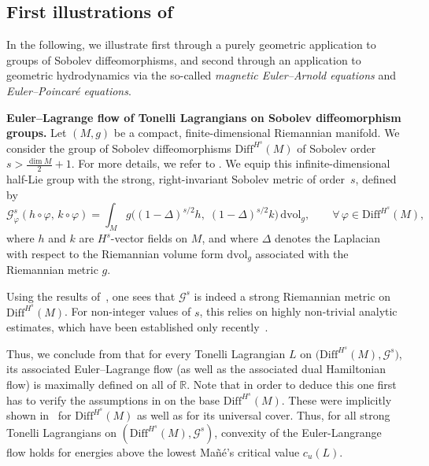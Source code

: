 \documentclass[11pt,reqno]{amsart}
\theoremstyle{plain}
\theoremstyle{definition}
\theoremstyle{plain} %
\theoremstyle{definition} %
\numberwithin{equation}{section}
\def\RR{{\mathbb R}}
\begin{document}
\subsection{First illustrations of } In the following, we illustrate  
first through a purely geometric application to groups of Sobolev diffeomorphisms, 
and second through an application to geometric hydrodynamics via the so-called 
\emph{magnetic Euler–Arnold equations} and \emph{Euler–Poincaré equations}.\medskip

\textbf{Euler–Lagrange flow of Tonelli Lagrangians on Sobolev diffeomorphism groups.}
Let \( (M, g) \) be a compact, finite-dimensional Riemannian manifold. 
We consider the group of Sobolev diffeomorphisms \( \mathrm{Diff}^{H^s}(M) \) 
of Sobolev order \( s > \frac{\dim M}{2} + 1 \). For more details, we refer to . 
We equip this infinite-dimensional half-Lie group with the strong, right-invariant Sobolev metric of order~\( s \), defined by
\begin{equation*}
    \mathcal{G}^s_{\varphi}(h \circ \varphi,\, k \circ \varphi) 
    = \int_M g\big( (1 - \Delta)^{s/2} h,\; (1 - \Delta)^{s/2} k \big)\, \mathrm{dvol}_g, 
    \qquad \forall\, \varphi \in \mathrm{Diff}^{H^s}(M),
\end{equation*}
where \( h \) and \( k \) are \( H^s \)-vector fields on \( M \), and where 
\( \Delta \) denotes the Laplacian with respect to the Riemannian volume form \( \mathrm{dvol}_g \) associated with the Riemannian metric \( g \). 

Using the results of~\cite{EM70,BauerBruverisCismasEscherKolev2020,BauerEscherKolev2015}, 
one sees that \( \mathcal{G}^s \) is indeed a strong Riemannian metric on \( \mathrm{Diff}^{H^s}(M) \). 
For non-integer values of \( s \), this relies on highly non-trivial analytic estimates, 
which have been established only recently~\cite{BauerBruverisCismasEscherKolev2020,BauerEscherKolev2015}. 

Thus, we conclude from  that for every Tonelli Lagrangian $L$ on $ \big(\mathrm{Diff}^{H^s}(M), \mathcal{G}^s \big)$, 
its associated Euler–Lagrange flow (as well as the associated dual Hamiltonian flow) is maximally defined on all of $\RR$. Note that in order to deduce this one first has to verify the assumptions in  on the base \( \mathrm{Diff}^{H^s}(M) \).
These were implicitly shown in~\cite{BruverisVialard2017} for \( \mathrm{Diff}^{H^s}(M) \) as well as for its universal cover.
Thus, for all strong Tonelli Lagrangians on
\( (\mathrm{Diff}^{H^s}(M), \mathcal{G}^s)\), 
convexity of the Euler-Langrange flow holds for energies above the lowest Mañé’s critical value $c_u(L)$.  
\end{document}
